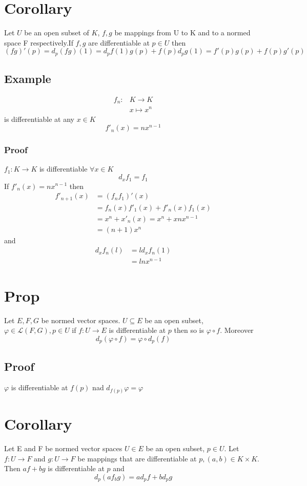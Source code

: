 \documentclass{book}
\begin{document}
\section{Corollary}
Let $U$ be an open subset of $K$, $f,g$ be mappings from U to K and to a normed space F respectively.If $f,g$ are differentiable at $p\in U$ then $$(fg)'(p)=d_p(fg)(1)=d_pf(1)g(p)+f(p)d_pg(1)=f'(p)g(p)+f(p)g'(p)$$
\subsection*{Example}
$$\begin{aligned}
    f_n: &K\rightarrow K\\
    &x\mapsto x^n
\end{aligned}$$
is differentiable at any $x\in K$$$f'_n(x)=nx^{n-1}$$
\subsubsection*{Proof}
$f_1:K\rightarrow K$ is differentiable $\forall x\in K$$$d_xf_1=f_1$$
If $f'_n(x)=nx^{n-1}$ then $$\begin{aligned}
    f'_{n+1}(x) &= (f_nf_1)'(x)\\
    &= f_n(x)f'_1(x)+f'_n(x)f_1(x)\\
    &= x^n+x'_n(x)=x^n+xnx^{n-1}\\
    &=(n+1)x^n
\end{aligned}$$
and $$\begin{aligned}
    d_xf_n(l) &= ld_xf_n(1)\\
    &=lnx^{n-1}
\end{aligned}$$
\section{Prop}
Let $E,F,G$ be normed vector spaces. $U\subseteq E$ be an open subset, $\varphi\in \mathscr{L}(F,G),p\in U$ if $f:U\rightarrow E$ is differentiable at $p$ then so is $\varphi\circ f$. Moreover $$d_p(\varphi\circ f)=\varphi\circ d_p(f)$$
\subsection*{Proof}
$\varphi$ is differentiable at $f(p)$ nad $d_{f(p)}\varphi=\varphi$
\section{Corollary}
Let E and F be normed  vector spaces $U\in E$ be an open subset, $p\in U$. Let $f:U\rightarrow F$ and $g:U\rightarrow F$ be mappings that are differentiable at $p,(a,b)\in K\times K$. Then $af+bg$ is differentiable at $p$ and $$d_p(af_bg)=ad_pf+bd_pg$$
\end{document}

